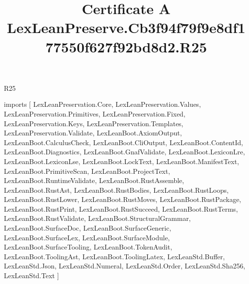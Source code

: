 \begin{lexlean}{R25}
\title{Certificate A LexLeanPreserve.Cb3f94f79f9e8df177550f627f92bd8d2.R25}
\begin{coremodule}
imports [
  LexLeanPreservation.Core,
  LexLeanPreservation.Values,
  LexLeanPreservation.Primitives,
  LexLeanPreservation.Fixed,
  LexLeanPreservation.Keys,
  LexLeanPreservation.Templates,
  LexLeanPreservation.Validate,
  LexLeanBoot.AxiomOutput,
  LexLeanBoot.CalculusCheck,
  LexLeanBoot.CliOutput,
  LexLeanBoot.ContentId,
  LexLeanBoot.Diagnostics,
  LexLeanBoot.GnafValidate,
  LexLeanBoot.LexiconLre,
  LexLeanBoot.LexiconLse,
  LexLeanBoot.LockText,
  LexLeanBoot.ManifestText,
  LexLeanBoot.PrimitiveScan,
  LexLeanBoot.ProjectText,
  LexLeanBoot.RuntimeValidate,
  LexLeanBoot.RustAssemble,
  LexLeanBoot.RustAst,
  LexLeanBoot.RustBodies,
  LexLeanBoot.RustLoops,
  LexLeanBoot.RustLower,
  LexLeanBoot.RustMoves,
  LexLeanBoot.RustPackage,
  LexLeanBoot.RustPrint,
  LexLeanBoot.RustSucceed,
  LexLeanBoot.RustTerms,
  LexLeanBoot.RustValidate,
  LexLeanBoot.StructuralGrammar,
  LexLeanBoot.SurfaceDoc,
  LexLeanBoot.SurfaceGeneric,
  LexLeanBoot.SurfaceLex,
  LexLeanBoot.SurfaceModule,
  LexLeanBoot.SurfaceTooling,
  LexLeanBoot.TokenAudit,
  LexLeanBoot.ToolingAst,
  LexLeanBoot.ToolingLatex,
  LexLeanStd.Buffer,
  LexLeanStd.Json,
  LexLeanStd.Numeral,
  LexLeanStd.Order,
  LexLeanStd.Sha256,
  LexLeanStd.Text
]


\end{coremodule}
\end{lexlean}
